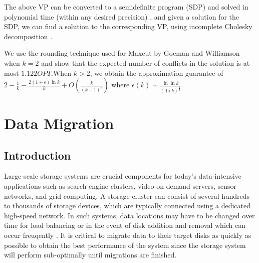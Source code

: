 \documentclass[titlepage, 11pt]{article}
\begin{document}
The above VP can be converted to a semidefinite program (SDP) and
solved in polynomial time (within any desired precision) 
\cite{ali95,gls81,gls87,nn90,nn94}, and given a solution for the SDP,
we can find a solution to the corresponding VP, 
using incomplete Cholesky decomposition \cite{golub83}. 

We use the rounding technique used for {\sc Maxcut} by Goeman and Williamson 
\cite{GW} when $k = 2$ and show that the expected number of conflicts 
in the solution is at most $1.122OPT$.When $k > 2$, we obtain  the approximation guarantee of  $ 2 - \frac{1}{k} - \frac{2(1 + \epsilon) \ln k}{k} +
 O(\frac{k}{(k-1)^2})$ 
where $\epsilon(k)\sim \frac{\ln \ln k}{(\ln k)^\frac{1}{2}} $.\\



\section{Data Migration}

\subsection{Introduction}

Large-scale storage systems are crucial components for today's data-intensive 
applications such as search engine clusters, video-on-demand servers, sensor networks, and grid computing.
A storage cluster can consist of several hundreds to thousands of storage devices,
which are typically 
connected using a dedicated high-speed network. In such systems, data locations may have to be changed over time 
for load balancing or in the event of disk addition and removal which can occur freuqently \cite{UCSB}.
It is critical to migrate data to their target disks
as quickly as possible to obtain the best performance of the system
since the storage system will perform sub-optimally  
until migrations are finished.
\end{document}
